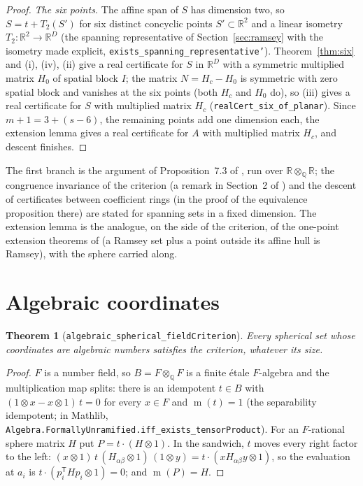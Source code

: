 \documentclass[11pt]{article}
\newtheorem{theorem}{Theorem}
\theoremstyle{definition}
\theoremstyle{remark}
\newcommand{\R}{\mathbb{R}}
\newcommand{\Q}{\mathbb{Q}}
\newcommand{\B}{B}
\DeclareMathOperator{\m}{m}
\begin{document}
\begin{proof}
\emph{The six points.} The affine span of $S$ has dimension two, so $S = t + T_2(S')$ for six distinct
concyclic points $S' \subset \R^2$ and a linear isometry $T_2 \colon \R^2 \to \R^D$ (the spanning
representative of Section~\ref{sec:ramsey} with the isometry made explicit,
\texttt{exists\_spanning\_representative'}). Theorem~\ref{thm:six} and (i), (iv), (ii) give a real
certificate for $S$ in $\R^D$ with a symmetric multiplied matrix $H_0$ of spatial block $I$; the matrix
$N = H_c - H_0$ is symmetric with zero spatial block and vanishes at the six points (both $H_c$ and $H_0$
do), so (iii) gives a real certificate for $S$ with multiplied matrix $H_c$ (\texttt{realCert\_six\_of\_planar}).
Since $m + 1 = 3 + (s - 6)$, the remaining points add one dimension each, the extension lemma gives a real
certificate for $A$ with multiplied matrix $H_c$, and descent finishes.
\end{proof}

The first branch is the argument of Proposition~7.3 of \cite{oai}, run over $\R \otimes_\Q \R$; the
congruence invariance of the criterion (a remark in Section~2 of \cite{oai}) and the descent of
certificates between coefficient rings (in the proof of the equivalence proposition there) are stated for
spanning sets in a fixed dimension. The extension lemma is the analogue, on the side of the criterion, of the one-point
extension theorems of \cite{moore, mirabi} (a Ramsey set plus a point outside its affine hull is
Ramsey), with the sphere carried along.

\section{Algebraic coordinates}\label{sec:alg}

\begin{theorem}[\texttt{algebraic\_spherical\_fieldCriterion}]\label{thm:alg}
Every spherical set whose coordinates are algebraic numbers satisfies the criterion, whatever its size.
\end{theorem}

\begin{proof}
$F$ is a number field, so $\B = F \otimes_\Q F$ is a finite \'etale $F$-algebra and the multiplication
map splits: there is an idempotent $t \in \B$ with $(1 \otimes x - x \otimes 1)\, t = 0$ for every $x \in F$
and $\m(t) = 1$ (the separability idempotent; in Mathlib,
\texttt{Algebra.FormallyUnramified.iff\_exists\_tensorProduct}). For an $F$-rational sphere matrix $H$
put $P = t \cdot (H \otimes 1)$. In the sandwich, $t$ moves every right factor to the left:
$(x \otimes 1)\, t\, (H_{\alpha\beta} \otimes 1)\, (1 \otimes y) = t \cdot (x H_{\alpha\beta} y \otimes 1)$, so the
evaluation at $a_i$ is $t \cdot (p_i^{\mathsf T} H p_i \otimes 1) = 0$; and $\m(P) = H$.
\end{proof}
\end{document}
